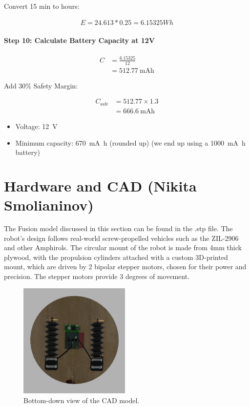 \documentclass[12pt,a4paper,english]{article}
\begin{document}
Convert 15 min to hours:

\begin{align*}
E = 24.613 * 0.25 = 6.15325 Wh
\end{align*}

\paragraph{Step 10: Calculate Battery Capacity at 12V}

\begin{align*}
    C &= \frac{6.15325}{12} \\
      &= \SI{512.77}{\milli\ampere\hour}
\end{align*}

Add 30\% Safety Margin:

\begin{align*}
    C_{\text{safe}} &= 512.77 \times 1.3 \\
                    &= \SI{666.6}{\milli\ampere\hour}
\end{align*}

\begin{itemize}
    \item Voltage: \SI{12}{\volt}
    \item Minimum capacity: \SI{670}{\milli\ampere\hour} (rounded up) (we end up using a \SI{1000}{\milli\ampere\hour} battery)
\end{itemize}

\section{Hardware and CAD (Nikita Smolianinov)}

The Fusion model discussed in this section can be found in the .stp file. The robot's design follows real-world screw-propelled vehicles such as the  ZIL-2906 and other Amphirols. The circular mount of the robot is made from 4mm thick plywood, with the propulsion cylinders attached with a custom 3D-printed mount, which are driven by 2 bipolar stepper motors, chosen for their power and precision. The stepper motors provide 3 degrees of movement. 

\begin{figure}[!ht]
  \begin{center}
    \includegraphics[width=5.5cm]{./Figures/cad.png}
    \caption{Bottom-down view of the CAD model.}
  \end{center}
\end{figure}
\end{document}
